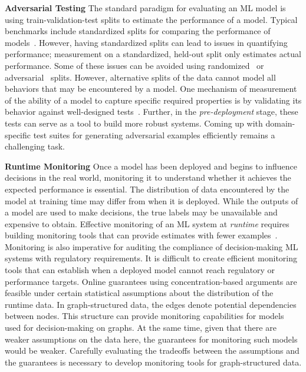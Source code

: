 \noindent \textbf{Adversarial Testing}
The standard paradigm for evaluating an ML model is using train-validation-test splits to estimate the performance of a model. 
Typical benchmarks include standardized splits for comparing the performance of models~\citep{gorman2019need}.
However, having standardized splits can lead to issues in quantifying performance; measurement on a standardized, held-out split only estimates actual performance.
Some of these issues can be avoided using randomized~\citep{gorman2019need} or adversarial~\citep{sogaard2021need} splits.
However, alternative splits of the data cannot model all behaviors that may be encountered by a model.
One mechanism of measurement of the ability of a model to capture specific required properties is by validating its behavior against well-designed tests~\cite{ribeiro2020beyond}.
Further, in the \textit{pre-deployment} stage, these tests can serve as a tool to build more robust systems. 
Coming up with domain-specific test suites for generating adversarial examples efficiently remains a challenging task.

\noindent \textbf{Runtime Monitoring}
Once a model has been deployed and begins to influence decisions in the real world, monitoring it to understand whether it achieves the expected performance is essential.
The distribution of data encountered by the model at training time may differ from when it is deployed. 
While the outputs of a model are used to make decisions, the true labels may be unavailable and expensive to obtain.
Effective monitoring of an ML system at \textit{runtime} requires building monitoring tools that can provide estimates with fewer examples~\citep{ginart2022mldemon}.
Monitoring is also imperative for auditing the compliance of decision-making ML systems with regulatory requirements.
It is difficult to create efficient monitoring tools that can establish when a deployed model cannot reach regulatory or performance targets.
Online guarantees using concentration-based arguments are feasible under certain statistical assumptions about the distribution of the runtime data.
In graph-structured data, the edges denote potential dependencies between nodes.
This structure can provide monitoring capabilities for models used for decision-making on graphs.
At the same time, given that there are weaker assumptions on the data here, the guarantees for monitoring such models would be weaker.
Carefully evaluating the tradeoffs between the assumptions and the guarantees is necessary to develop monitoring tools for graph-structured data.

